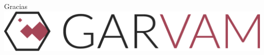 \documentclass{beamer}
\begin{document}
\begin{frame}{Gracias}
	\centering
	\includegraphics[width=0.6\paperwidth, height = 0.2\paperheight]{images_latex/logo}
\end{frame}


\end{document}
